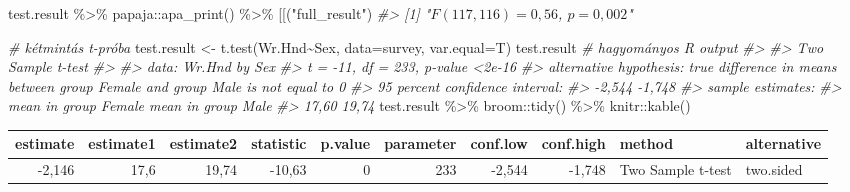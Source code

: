 \documentclass[
]{book}
\newenvironment{Shaded}{\begin{snugshade}}{\end{snugshade}}
\newcommand{\AttributeTok}[1]{\textcolor[rgb]{0.77,0.63,0.00}{#1}}
\newcommand{\CommentTok}[1]{\textcolor[rgb]{0.56,0.35,0.01}{\textit{#1}}}
\newcommand{\FunctionTok}[1]{\textcolor[rgb]{0.00,0.00,0.00}{#1}}
\newcommand{\NormalTok}[1]{#1}
\newcommand{\OtherTok}[1]{\textcolor[rgb]{0.56,0.35,0.01}{#1}}
\newcommand{\SpecialCharTok}[1]{\textcolor[rgb]{0.00,0.00,0.00}{#1}}
\newcommand{\StringTok}[1]{\textcolor[rgb]{0.31,0.60,0.02}{#1}}
\begin{document}
\begin{Shaded}
\begin{Highlighting}[]
\NormalTok{test.result }\SpecialCharTok{\%\textgreater{}\%}\NormalTok{ papaja}\SpecialCharTok{::}\FunctionTok{apa\_print}\NormalTok{() }\SpecialCharTok{\%\textgreater{}\%} \StringTok{\textasciigrave{}}\AttributeTok{[[}\StringTok{\textasciigrave{}}\NormalTok{(}\StringTok{"full\_result"}\NormalTok{)}
\CommentTok{\#\textgreater{} [1] "$F(117, 116) = 0,56$, $p = 0,002$"}


\CommentTok{\# kétmintás t{-}próba}
\NormalTok{test.result }\OtherTok{\textless{}{-}} \FunctionTok{t.test}\NormalTok{(Wr.Hnd}\SpecialCharTok{\textasciitilde{}}\NormalTok{Sex, }\AttributeTok{data=}\NormalTok{survey, }\AttributeTok{var.equal=}\NormalTok{T)}
\NormalTok{test.result   }\CommentTok{\# hagyományos R output}
\CommentTok{\#\textgreater{} }
\CommentTok{\#\textgreater{}  Two Sample t{-}test}
\CommentTok{\#\textgreater{} }
\CommentTok{\#\textgreater{} data:  Wr.Hnd by Sex}
\CommentTok{\#\textgreater{} t = {-}11, df = 233, p{-}value \textless{}2e{-}16}
\CommentTok{\#\textgreater{} alternative hypothesis: true difference in means between group Female and group Male is not equal to 0}
\CommentTok{\#\textgreater{} 95 percent confidence interval:}
\CommentTok{\#\textgreater{}  {-}2,544 {-}1,748}
\CommentTok{\#\textgreater{} sample estimates:}
\CommentTok{\#\textgreater{} mean in group Female   mean in group Male }
\CommentTok{\#\textgreater{}                17,60                19,74}
\NormalTok{test.result }\SpecialCharTok{\%\textgreater{}\%}\NormalTok{ broom}\SpecialCharTok{::}\FunctionTok{tidy}\NormalTok{() }\SpecialCharTok{\%\textgreater{}\%}\NormalTok{ knitr}\SpecialCharTok{::}\FunctionTok{kable}\NormalTok{()}
\end{Highlighting}
\end{Shaded}

\begin{tabular}{r|r|r|r|r|r|r|r|l|l}
\hline
estimate & estimate1 & estimate2 & statistic & p.value & parameter & conf.low & conf.high & method & alternative\\
\hline
-2,146 & 17,6 & 19,74 & -10,63 & 0 & 233 & -2,544 & -1,748 & Two Sample t-test & two.sided\\
\hline
\end{tabular}
\end{document}
